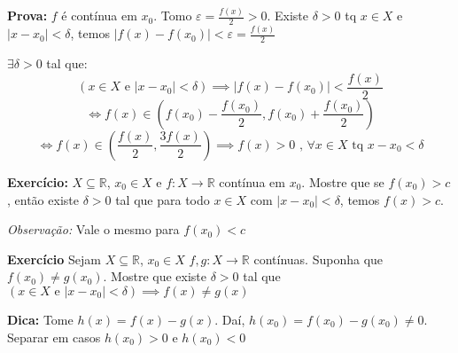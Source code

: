 \documentclass[12pt]{article}
\begin{document}
    \textbf{Prova: } $f$ é contínua em $x_0$. Tomo $\varepsilon = \frac{f(x)}{2} > 0$. Existe $\delta > 0$ tq $x \in X$ e $|x - x_0| < \delta$, temos $|f(x) - f(x_0)| < \varepsilon = \frac{f(x)}{2}$

    $\exists \delta > 0$ tal que:
    \begin{equation*}
        \left(x \in X \text{ e } |x - x_0| < \delta \right) \implies |f(x) - f(x_0)| < \frac{f(x)}{2}
    \end{equation*}
    \begin{equation*}
        \iff f(x) \in \left(f(x_0) - \frac{f(x_0)}{2}, f(x_0) + \frac{f(x_0)}{2}\right)
    \end{equation*}
    \begin{equation*}
        \iff f(x) \in \left(\frac{f(x)}{2}, \frac{3f(x)}{2} \right) \implies f(x) > 0 \text{ , } \forall x \in X \text{ tq } x - x_0 < \delta
    \end{equation*}

    \textbf{Exercício:} $X \subseteq \mathbb{R}$, $x_0 \in X$ e $f: X \to \mathbb{R}$ contínua em $x_0$. Mostre que se $f(x_0) > c$, então existe $\delta > 0$ tal que para todo $x \in X$ com $|x - x_0| < \delta$, temos $f(x) > c$.

    \textit{Observação: } Vale o mesmo para $f(x_0) < c$

    \textbf{Exercício} Sejam $X \subseteq \mathbb{R}$, $x_0 \in X$ $f,g: X \to \mathbb{R}$ contínuas. Suponha que $f(x_0) \neq g(x_0)$. Mostre que existe $\delta > 0$ tal que $\left(x \in X \text{ e } |x - x_0| < \delta \right) \implies f(x) \neq g(x)$

    \textbf{Dica:} Tome $h(x) = f(x) - g(x)$. Daí, $h(x_0) = f(x_0) - g(x_0) \neq 0$. Separar em casos $h(x_0) > 0$ e $h(x_0) < 0$
\end{document}
